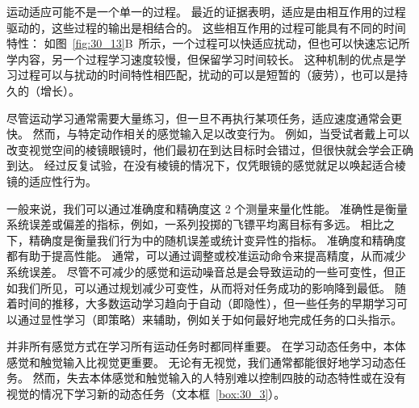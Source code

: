 运动适应可能不是一个单一的过程。
最近的证据表明，适应是由相互作用的过程驱动的，这些过程的输出是相结合的。
这些相互作用的过程可能具有不同的时间特性：
如图~\ref{fig:30_13}B~所示，一个过程可以快适应扰动，但也可以快速忘记所学内容，另一个过程学习速度较慢，但保留学习时间较长。
这种机制的优点是学习过程可以与扰动的时间特性相匹配，扰动的可以是短暂的（疲劳），也可以是持久的（增长）。


尽管运动学习通常需要大量练习，但一旦不再执行某项任务，适应速度通常会更快。
然而，与特定动作相关的感觉输入足以改变行为。
例如，当受试者戴上可以改变视觉空间的棱镜眼镜时，他们最初在到达目标时会错过，但很快就会学会正确到达。
经过反复试验，在没有棱镜的情况下，仅凭眼镜的感觉就足以唤起适合棱镜的适应性行为。


一般来说，我们可以通过准确度和精确度这 2 个测量来量化性能。
准确性是衡量系统误差或偏差的指标，例如，一系列投掷的飞镖平均离目标有多远。
相比之下，精确度是衡量我们行为中的随机误差或统计变异性的指标。
准确度和精确度都有助于提高性能。
通常，可以通过调整或校准运动命令来提高精度，从而减少系统误差。
尽管不可减少的感觉和运动噪音总是会导致运动的一些可变性，但正如我们所见，可以通过规划减少可变性，从而将对任务成功的影响降到最低。
随着时间的推移，大多数运动学习趋向于自动（即隐性），但一些任务的早期学习可以通过显性学习（即策略）来辅助，例如关于如何最好地完成任务的口头指示。


并非所有感觉方式在学习所有运动任务时都同样重要。
在学习动态任务中，本体感觉和触觉输入比视觉更重要。 无论有无视觉，我们通常都能很好地学习动态任务。
然而，失去本体感觉和触觉输入的人特别难以控制四肢的动态特性或在没有视觉的情况下学习新的动态任务（文本框~\ref{box:30_3}）。


